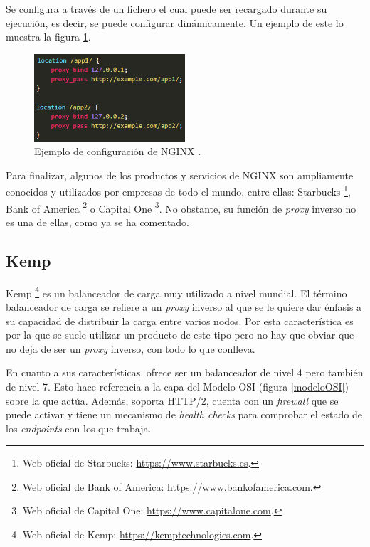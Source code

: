 \documentclass[11pt,spanish,listoffigures]{tfgetsinf}
\begin{document}
Se configura a través de un fichero el cual puede ser recargado durante su ejecución, es decir, se puede configurar dinámicamente. Un ejemplo de este lo muestra la figura \ref{configuracionNGINX}.

\begin{figure}[ht]
\centering
\includegraphics[width=0.5\textwidth]{imagenes/configuracionNGINX}
\caption[Ejemplo de configuración de NGINX.]{Ejemplo de configuración de NGINX \cite{NGINX_documentacion}.}
	\label{configuracionNGINX}
\end{figure}

Para finalizar, algunos de los productos y servicios de NGINX son ampliamente conocidos y utilizados por empresas de todo el mundo, entre ellas: Starbucks \footnote{Web oficial de Starbucks: \url{https://www.starbucks.es}.}, Bank of America \footnote{Web oficial de Bank of America: \url{https://www.bankofamerica.com}.} o Capital One \footnote{Web oficial de Capital One: \url{https://www.capitalone.com}.}. No obstante, su función de \emph{proxy} inverso no es una de ellas, como ya se ha comentado.


		\subsection{Kemp}

Kemp \footnote{Web oficial de Kemp: \url{https://kemptechnologies.com}.} es un balanceador de carga muy utilizado a nivel mundial. El término balanceador de carga se refiere a un \emph{proxy} inverso al que se le quiere dar énfasis a su capacidad de distribuir la carga entre varios nodos. Por esta característica es por la que se suele utilizar un producto de este tipo pero no hay que obviar que no deja de ser un \emph{proxy} inverso, con todo lo que conlleva.

En cuanto a sus características, ofrece ser un balanceador de nivel 4 pero también de nivel 7. Esto hace referencia a la capa del Modelo OSI (figura \ref{modeloOSI}) sobre la que actúa. Además, soporta HTTP/2, cuenta con un \emph{firewall} que se puede activar y tiene un mecanismo de \emph{health checks} para comprobar el estado de los \emph{endpoints} con los que trabaja.
\end{document}
